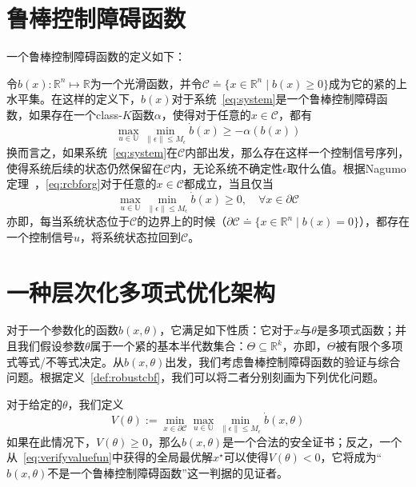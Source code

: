 \section{鲁棒控制障碍函数}
一个鲁棒控制障碍函数的定义如下：
\begin{definition}[鲁棒控制障碍函数]\label{def:robustcbf}
    令$b(x): \mathbb{R}^n \mapsto \mathbb{R}$为一个光滑函数，并令$\mathcal{C} \doteq \{ x \in \mathbb{R}^n \mid b(x) \ge 0 \}$成为它的紧的上水平集。在这样的定义下，$b(x)$对于系统~\eqref{eq:system}是一个鲁棒控制障碍函数，如果存在一个class-$K$函数$\alpha$，使得对于任意的$x \in \mathcal{C}$，都有
    \begin{equation}\label{eq:rcbforg}
        \max_{u \in \mathbb{U}} \min_{\parallel \epsilon \parallel \le M_\epsilon} \dot{b}(x) \ge -\alpha(b(x))
    \end{equation}
    换而言之，如果系统~\eqref{eq:system}在$\mathcal{C}$内部出发，那么存在这样一个控制信号序列，使得系统后续的状态仍然保留在$\mathcal{C}$内，无论系统不确定性$\epsilon$取什么值。根据Nagumo定理~\cite{blanchini99automatica-set}，\eqref{eq:rcbforg}对于任意的$x \in \mathcal{C}$都成立，当且仅当
    \begin{equation}
        \max_{u \in \mathbb{U}} \min_{\parallel \epsilon \parallel \le M_\epsilon} \dot{b}(x) \ge 0, \quad \forall x\in \partial \mathcal{C}
    \end{equation}
    亦即，每当系统状态位于$\mathcal{C}$的边界上的时候（$\partial \mathcal{C} \doteq \{x \in \mathbb{R}^n \mid b(x) = 0\}$），都存在一个控制信号$u$，将系统状态拉回到$\mathcal{C}$。
\end{definition}

\section{一种层次化多项式优化架构}
\label{sec:formulation:multilevel}
对于一个参数化的函数$b(x, \theta)$，它满足如下性质：它对于$x$与$\theta$是多项式函数；并且我们假设参数$\theta$属于一个紧的基本半代数集合：$\Theta \subseteq \mathbb{R}^k$，亦即，$\Theta$被有限个多项式等式/不等式决定。从$b(x, \theta)$出发，我们考虑鲁棒控制障碍函数的验证与综合问题。根据定义~\ref{def:robustcbf}，我们可以将二者分别刻画为下列优化问题。

\begin{problem}[验证问题]\label{prob:cbfverification}
    对于给定的$\theta$，我们定义
    \begin{equation}\label{eq:verifyvaluefun}
        V(\theta) := \min_{x \in \partial \mathcal{C}} \max_{u \in \mathbb{U}} \min_{\parallel \epsilon \parallel \le M_\epsilon} \dot{b}(x, \theta)
    \end{equation}
    如果在此情况下，$V(\theta) \ge 0$，那么$b(x, \theta)$是一个合法的安全证书；反之，一个从~\eqref{eq:verifyvaluefun}中获得的全局最优解$x^\star$可以使得$V(\theta) < 0$，它将成为“$b(x, \theta)$不是一个鲁棒控制障碍函数”这一判据的见证者。
\end{problem}

